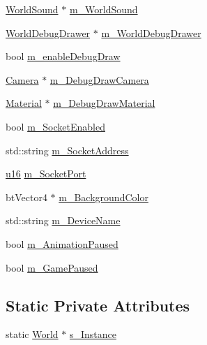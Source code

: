 \begin{DoxyCompactItemize}
\item 
\mbox{\hyperlink{classnjli_1_1_world_sound}{World\+Sound}} $\ast$ \mbox{\hyperlink{classnjli_1_1_world_a004cd4a3a730b83733b3ff91bfaedce2}{m\+\_\+\+World\+Sound}}
\item 
\mbox{\hyperlink{classnjli_1_1_world_debug_drawer}{World\+Debug\+Drawer}} $\ast$ \mbox{\hyperlink{classnjli_1_1_world_aa92f105e6f53c7d8c30b8e453e1181c8}{m\+\_\+\+World\+Debug\+Drawer}}
\item 
bool \mbox{\hyperlink{classnjli_1_1_world_ac9ab0b237e486a28bd08adf913b3908c}{m\+\_\+enable\+Debug\+Draw}}
\item 
\mbox{\hyperlink{classnjli_1_1_camera}{Camera}} $\ast$ \mbox{\hyperlink{classnjli_1_1_world_a5ae1a42d02339871c60b45ecacc92753}{m\+\_\+\+Debug\+Draw\+Camera}}
\item 
\mbox{\hyperlink{classnjli_1_1_material}{Material}} $\ast$ \mbox{\hyperlink{classnjli_1_1_world_a180a3f557467c6bb6d88cf05b691a6f4}{m\+\_\+\+Debug\+Draw\+Material}}
\item 
bool \mbox{\hyperlink{classnjli_1_1_world_ab701cb678bcb47262db407e4684608a2}{m\+\_\+\+Socket\+Enabled}}
\item 
std\+::string \mbox{\hyperlink{classnjli_1_1_world_a51c1d3b5047c2e10c2850faf137efa9a}{m\+\_\+\+Socket\+Address}}
\item 
\mbox{\hyperlink{_util_8h_a9e6c91d77e24643b888dbd1a1a590054}{u16}} \mbox{\hyperlink{classnjli_1_1_world_aafbdf669fc3dbc91c2b746b653ac4f17}{m\+\_\+\+Socket\+Port}}
\item 
bt\+Vector4 $\ast$ \mbox{\hyperlink{classnjli_1_1_world_acf0b94b1d7cba8d62158065b03de9012}{m\+\_\+\+Background\+Color}}
\item 
std\+::string \mbox{\hyperlink{classnjli_1_1_world_a9dc158249ba20ca7b1523cce0d8d309f}{m\+\_\+\+Device\+Name}}
\item 
bool \mbox{\hyperlink{classnjli_1_1_world_a5a261c335c55b2fd0e678e815a6cc85a}{m\+\_\+\+Animation\+Paused}}
\item 
bool \mbox{\hyperlink{classnjli_1_1_world_af387313aec7a62f3792e76d9610b70a8}{m\+\_\+\+Game\+Paused}}
\end{DoxyCompactItemize}
\subsection*{Static Private Attributes}
\begin{DoxyCompactItemize}
\item 
static \mbox{\hyperlink{classnjli_1_1_world}{World}} $\ast$ \mbox{\hyperlink{classnjli_1_1_world_afbef76d7d011571721a36b2eb625e997}{s\+\_\+\+Instance}}
\end{DoxyCompactItemize}


